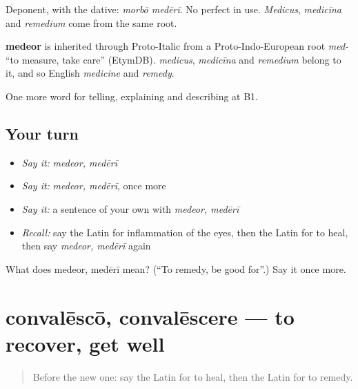 Deponent, with the dative: \emph{morbō medērī}. No perfect in use. \emph{Medicus}, \emph{medicīna} and \emph{remedium} come from the same root.

\begin{cousinweb}
\textbf{medeor} is inherited through Proto-Italic from a Proto-Indo-European root \emph{med-} \textquotedblleft{}to measure, take care\textquotedblright{} (EtymDB). \emph{medicus}, \emph{medicīna} and \emph{remedium} belong to it, and so English \emph{medicine} and \emph{remedy}.
\end{cousinweb}

\begin{grammarlens}[title={What you've built}]
One more word for telling, explaining and describing at B1.
\end{grammarlens}

\subsection*{Your turn}
\begin{itemize}
\raggedright
  \item \emph{Say it:} \emph{medeor, medērī}
  \item \emph{Say it:} \emph{medeor, medērī}, once more
  \item \emph{Say it:} a sentence of your own with \emph{medeor, medērī}
  \item \emph{Recall:} say the Latin for inflammation of the eyes, then the Latin for to heal, then say \emph{medeor, medērī} again
\end{itemize}

\begin{tcolorbox}[breakable,colback=teal!4,colframe=teal!35!black,title={Before you move on}]
What does medeor, medērī mean? (\textquotedblleft{}To remedy, be good for\textquotedblright{}.) Say it once more.
\end{tcolorbox}
\section[convalēscō, convalēscere]{convalēscō, convalēscere — to recover, get well}

\label{lesson:LA-C526-convalesco}



\begin{quote}
Before the new one: say the Latin for to heal, then the Latin for to remedy.
\end{quote}

